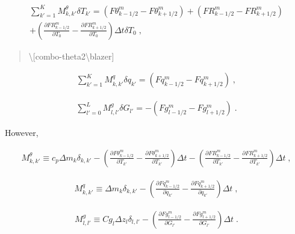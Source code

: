 \begin{eqnarray}
    \sum_{k'=1}^{K}  M^\theta_{k,k'} \delta T_{k'}
        =  (F\theta^{m}_{k-1/2} - F\theta^{m}_{k+1/2}) 
        + (FR^{m}_{k-1/2} - FR^{m}_{k+1/2})   \\
 +  \left(\frac{\partial FR^{m}_{k-1/2}}{\partial T_0} - \frac{\partial FR^{m}_{k+1/2}}{\partial T_0} \right)
     \Delta t\delta T_0 \; ,
\end{eqnarray}

\begin{quote}
\protect\hypertarget{combo-theta2}{}{\textbackslash{[}combo-theta2\textbackslash blazer{]}}
\end{quote}

\begin{eqnarray}
 \sum_{k'=1}^{K}  M^q_{k,k'} \delta q_{k'}
         = (Fq^{m}_{k-1/2} - Fq^{m}_{k+1/2}) \; ,
\end{eqnarray}

\begin{quote}
\protect\hypertarget{combo-q2}{}{\blazer[combo-q2]}
\end{quote}

\begin{eqnarray}
  \sum_{l'=0}^{L} M^g_{l,l'} \delta G_{l'}
         = - (Fg^{m}_{l-1/2} - Fg^{m}_{l+1/2}) \; .
\end{eqnarray}

\begin{quote}
\protect\hypertarget{combo-g2}{}{\blazer[combo-g2]}
\end{quote}

However,

\begin{eqnarray}
M^{\theta}_{k,k'} \equiv c_p \Delta m_k \delta_{k,k'}
          -  \left(  \frac{\partial F\theta^{m}_{k-1/2}}{\partial T_{k'}} 
                   - \frac{\partial F\theta^{m}_{k+1/2}}{\partial T_{k'}} \right) \Delta t
          -  \left(  \frac{\partial FR^{m}_{k-1/2}}{\partial T_{k'}} 
                   - \frac{\partial FR^{m}_{k+1/2}}{\partial T_{k'}} \right) \Delta t \; , 
\end{eqnarray}

\begin{eqnarray}
M^{q}_{k,k'} \equiv \Delta m_k \delta_{k,k'}
          -  \left(  \frac{\partial Fq^{m}_{k-1/2}}{\partial q_{k'}} 
                   - \frac{\partial Fq^{m}_{k+1/2}}{\partial q_{k'}} \right) \Delta t \; ,
\end{eqnarray}

\begin{eqnarray}
M^{g}_{l,l'} \equiv Cg_l \Delta z_l \delta_{l,l'}
          -  \left(  \frac{\partial Fg^{m}_{l-1/2}}{\partial G_{l'}} 
                   - \frac{\partial Fg^{m}_{l+1/2}}{\partial G_{l'}} \right) \Delta t \; .
\end{eqnarray}

